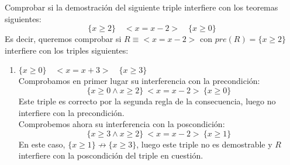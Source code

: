 \begin{ejercicio}
    Comprobar si la demostración del siguiente triple interfiere con los teoremas siguientes:
    \[
        \{x \geq 2\} \quad < x = x - 2 > \quad \{x \geq 0\}
    \]
    Es decir, queremos comprobar si $R\equiv <x = x-2>$ con $pre(R) = \{x\geq 2\}$ interfiere con los triples siguientes:
    \begin{enumerate}
        \item $\{x \geq 0\} \quad < x = x + 3 > \quad \{x \geq 3\}$\\
            Comprobamos en primer lugar su interferencia con la precondición:
            \begin{equation*}
                \{x\geq 0 \land x \geq 2\}\ <x=x-2>\ \{x\geq 0\}
            \end{equation*}
            Este triple es correcto por la segunda regla de la consecuencia, luego no interfiere con la precondición.\\

            Comprobemos ahora su interferencia con la poscondición:
            \begin{equation*}
                \{x\geq 3 \land x \geq 2\}\ <x=x-2>\ \{x\geq 1\}
            \end{equation*}
            En este caso, $\{x\geq 1\}\not\rightarrow\{x\geq 3\}$, luego este triple no es demostrable y $R$ interfiere con la poscondición del triple en cuestión.


\end{enumerate}
\end{ejercicio}
